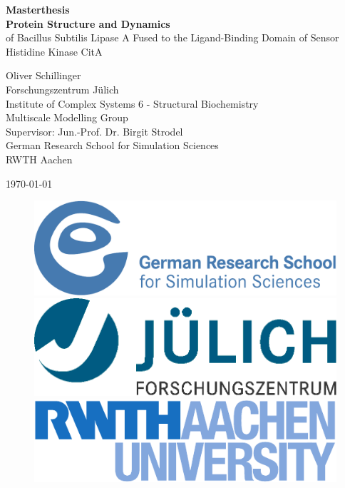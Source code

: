 \documentclass[english, a4paper, 12pt, titlepage, draft]{article}
\begin{document}

\begin{titlepage}
\begin{center}
{\huge \textbf{Masterthesis}}\\
\vspace{2cm}
{\large \textbf{Protein Structure and Dynamics} \\
\vspace{1cm}
of Bacillus Subtilis Lipase A Fused to the Ligand-Binding Domain of Sensor Histidine Kinase CitA
}

\vspace{2cm}

Oliver Schillinger \\
Forschungszentrum J\"ulich \\ Institute of Complex Systems 6 - Structural Biochemistry \\ Multiscale Modelling Group \\
Supervisor: Jun.-Prof. Dr. Birgit Strodel \\
\vspace{1cm}
German Research School for Simulation Sciences \\
RWTH Aachen

\vspace{1cm}

\today

\vfill

\begin{figure}[h!]
\includegraphics[width=.3\textwidth]{figures/logos/grs_logo.pdf}
\hspace{0.5cm}
\includegraphics[width=.3\textwidth]{figures/logos/fzj_logo.pdf}
\hspace{0.5cm}
\includegraphics[width=.3\textwidth]{figures/logos/rwth_logo.pdf}
\end{figure}
 
\end{center}
\end{titlepage}
\end{document}
